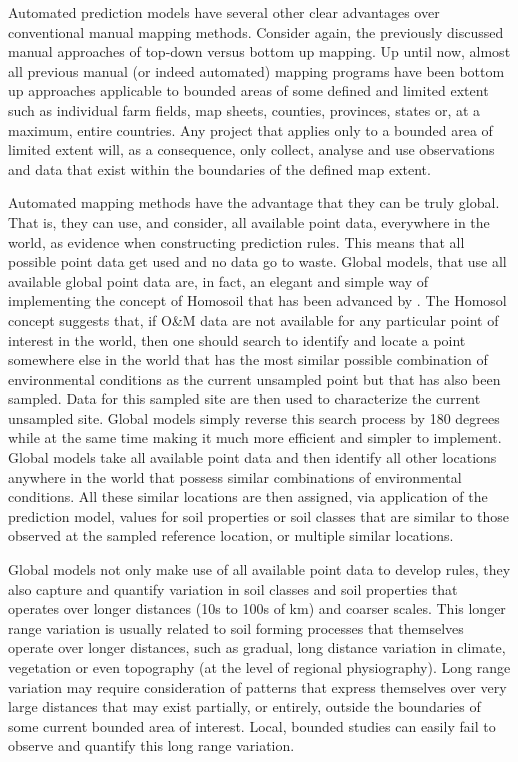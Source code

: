 \documentclass[graybox,natbib,nospthms,UStrade]{svmono}
\begin{document}
Automated prediction models have several other clear advantages over
conventional manual mapping methods. Consider again, the previously
discussed manual approaches of top-down versus bottom up mapping. Up
until now, almost all previous manual (or indeed automated) mapping
programs have been bottom up approaches applicable to bounded areas of
some defined and limited extent such as individual farm fields, map
sheets, counties, provinces, states or, at a maximum, entire countries.
Any project that applies only to a bounded area of limited extent will,
as a consequence, only collect, analyse and use observations and data
that exist within the boundaries of the defined map extent.

Automated mapping methods have the advantage that they can be truly
global. That is, they can use, and consider, all available point data,
everywhere in the world, as evidence when constructing prediction rules.
This means that all possible point data get used and no data go to
waste. Global models, that use all available global point data are, in
fact, an elegant and simple way of implementing the concept of Homosoil
that has been advanced by \citet{Mallavan2010PSS}. The Homosol concept
suggests that, if O\&M data are not available for any particular point of
interest in the world, then one should search to identify and locate a
point somewhere else in the world that has the most similar possible
combination of environmental conditions as the current unsampled point
but that has also been sampled. Data for this sampled site are then used
to characterize the current unsampled site. Global models simply reverse
this search process by 180 degrees while at the same time making it much
more efficient and simpler to implement. Global models take all
available point data and then identify all other locations anywhere in
the world that possess similar combinations of environmental conditions.
All these similar locations are then assigned, via application of the
prediction model, values for soil properties or soil classes that are
similar to those observed at the sampled reference location, or multiple
similar locations.

Global models not only make use of all available point data to develop
rules, they also capture and quantify variation in soil classes and soil
properties that operates over longer distances (10s to 100s of km) and
coarser scales. This longer range variation is usually related to soil
forming processes that themselves operate over longer distances, such as
gradual, long distance variation in climate, vegetation or even
topography (at the level of regional physiography). Long range variation
may require consideration of patterns that express themselves over very
large distances that may exist partially, or entirely, outside the
boundaries of some current bounded area of interest. Local, bounded
studies can easily fail to observe and quantify this long range
variation.
\end{document}
